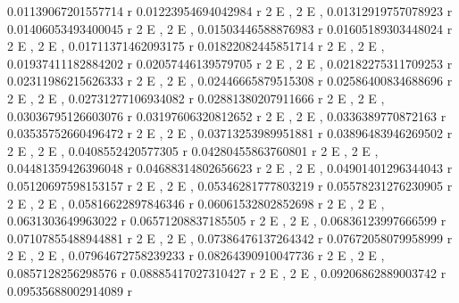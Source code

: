 \documentclass[a4paper,10pt]{article}
\begin{document}
\begin{eulernotebook}
\begin{eulercomment}
\begin{eulercomment}
\begin{eulercomment}
\begin{eulercomment}
\begin{eulercomment}
\begin{eulercomment}
\begin{eulercomment}
\begin{eulercomment}
\begin{eulercomment}
\begin{eulercomment}
\begin{eulercomment}
\begin{eulercomment}
\begin{eulercomment}
\begin{eulercomment}
\begin{eulercomment}
\begin{eulercomment}
\begin{eulercomment}
\begin{eulercomment}
\begin{eulercomment}
\begin{eulercomment}
\begin{eulercomment}
\begin{eulercomment}
\begin{eulercomment}
\begin{eulercomment}
\begin{euleroutput}
     0.01139067201557714 r     0.01223954694042984 r
  2 E                     , 2 E                     , 
     0.01312919757078923 r     0.01406053493400045 r
  2 E                     , 2 E                     , 
     0.01503446588876983 r     0.01605189303448024 r
  2 E                     , 2 E                     , 
     0.01711371462093175 r     0.01822082445851714 r
  2 E                     , 2 E                     , 
     0.01937411182884202 r     0.02057446139579705 r
  2 E                     , 2 E                     , 
     0.02182275311709253 r     0.02311986215626333 r
  2 E                     , 2 E                     , 
     0.02446665879515308 r     0.02586400834688696 r
  2 E                     , 2 E                     , 
     0.02731277106934082 r     0.02881380207911666 r
  2 E                     , 2 E                     , 
     0.03036795126603076 r     0.03197606320812652 r
  2 E                     , 2 E                     , 
     0.0336389770872163 r     0.03535752660496472 r
  2 E                    , 2 E                     , 
     0.03713253989951881 r     0.03896483946269502 r
  2 E                     , 2 E                     , 
     0.0408552420577305 r     0.04280455863760801 r
  2 E                    , 2 E                     , 
     0.04481359426396048 r     0.04688314802656623 r
  2 E                     , 2 E                     , 
     0.04901401296344043 r     0.05120697598153157 r
  2 E                     , 2 E                     , 
     0.05346281777803219 r     0.05578231276230905 r
  2 E                     , 2 E                     , 
     0.05816622897846346 r     0.06061532802852698 r
  2 E                     , 2 E                     , 
     0.0631303649963022 r     0.06571208837185505 r
  2 E                    , 2 E                     , 
     0.06836123997666599 r     0.07107855488944881 r
  2 E                     , 2 E                     , 
     0.07386476137264342 r     0.07672058079958999 r
  2 E                     , 2 E                     , 
     0.07964672758239233 r     0.08264390910047736 r
  2 E                     , 2 E                     , 
     0.0857128256298576 r     0.08885417027310427 r
  2 E                    , 2 E                     , 
     0.09206862889003742 r     0.09535688002914089 r

\end{euleroutput}
\end{eulercomment}
\end{eulercomment}
\end{eulercomment}
\end{eulercomment}
\end{eulercomment}
\end{eulercomment}
\end{eulercomment}
\end{eulercomment}
\end{eulercomment}
\end{eulercomment}
\end{eulercomment}
\end{eulercomment}
\end{eulercomment}
\end{eulercomment}
\end{eulercomment}
\end{eulercomment}
\end{eulercomment}
\end{eulercomment}
\end{eulercomment}
\end{eulercomment}
\end{eulercomment}
\end{eulercomment}
\end{eulercomment}
\end{eulercomment}
\end{eulernotebook}
\end{document}
